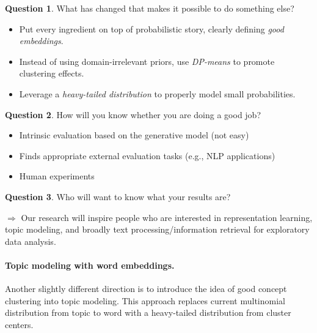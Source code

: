 \documentclass[11pt]{article}
\theoremstyle{plain} \numberwithin{equation}{section}
\theoremstyle{definition}
\newtheorem{question}{Question}
\newcounter{list}
\begin{document}
\begin{question}{What has changed that makes it possible to do something else?}\end{question}
\vspace{-10px}
\begin{itemize}
  \vspace{-10px}
  \setlength\itemsep{1px}
  \setlength{\itemindent}{0.4in}
  \item Put every ingredient on top of probabilistic story,  clearly defining \textit{good embeddings}.
  \item Instead of using domain-irrelevant priors, use \textit{DP-means} to promote clustering effects.
  \item Leverage a \textit{heavy-tailed distribution} to properly model small probabilities. 
\end{itemize}
\vspace{3px}


\begin{question}{How will you know whether you are doing a good job?}\end{question}
\vspace{-10px}
\begin{itemize}
  \vspace{-10px}
  \setlength\itemsep{1px}
  \setlength{\itemindent}{0.4in}
  \item Intrinsic evaluation based on the generative model (not easy)
  \item Finds appropriate external evaluation tasks (e.g., NLP applications)
  \item Human experiments  
\end{itemize}
\vspace{3px}


\begin{question}{Who will want to know what your results are?}\end{question}
\vspace{-10px}
$\Rightarrow$ Our research will inspire people who are interested in representation learning, topic modeling, and broadly text processing/information retrieval for exploratory data analysis.

\paragraph{Topic modeling with word embeddings.} Another slightly different direction is to introduce the idea of good concept clustering into topic modeling. This approach replaces current multinomial distribution from topic to word with a heavy-tailed distribution from cluster centers.

% 
% 
\end{document}
